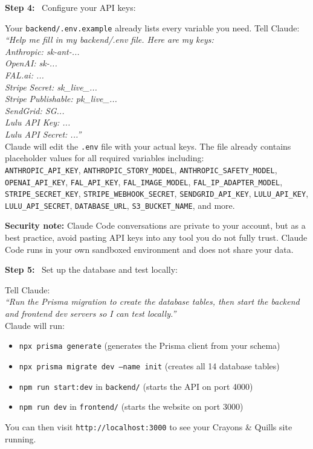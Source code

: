 \documentclass[12pt, letterpaper, oneside]{book}
\newcommand{\step}[1]{\noindent\textbf{\textcolor{primary}{Step #1:}}~}
\begin{document}
\step{4} Configure your API keys:
\begin{actionbox}
Your \texttt{backend/.env.example} already lists every variable you need. Tell Claude:\\[4pt]
\textit{``Help me fill in my backend/.env file. Here are my keys:}\\
\textit{Anthropic: sk-ant-...}\\
\textit{OpenAI: sk-...}\\
\textit{FAL.ai: ...}\\
\textit{Stripe Secret: sk\_live\_...}\\
\textit{Stripe Publishable: pk\_live\_...}\\
\textit{SendGrid: SG...}\\
\textit{Lulu API Key: ...}\\
\textit{Lulu API Secret: ...''}\\[4pt]
Claude will edit the \texttt{.env} file with your actual keys. The file already contains placeholder values for all required variables including:\\
\texttt{ANTHROPIC\_API\_KEY}, \texttt{ANTHROPIC\_STORY\_MODEL}, \texttt{ANTHROPIC\_SAFETY\_MODEL}, \texttt{OPENAI\_API\_KEY}, \texttt{FAL\_API\_KEY}, \texttt{FAL\_IMAGE\_MODEL}, \texttt{FAL\_IP\_ADAPTER\_MODEL}, \texttt{STRIPE\_SECRET\_KEY}, \texttt{STRIPE\_WEBHOOK\_SECRET}, \texttt{SENDGRID\_API\_KEY}, \texttt{LULU\_API\_KEY}, \texttt{LULU\_API\_SECRET}, \texttt{DATABASE\_URL}, \texttt{S3\_BUCKET\_NAME}, and more.
\end{actionbox}

\begin{warningbox}
\textbf{Security note:} Claude Code conversations are private to your account, but as a best practice, avoid pasting API keys into any tool you do not fully trust. Claude Code runs in your own sandboxed environment and does not share your data.
\end{warningbox}

\step{5} Set up the database and test locally:
\begin{actionbox}
Tell Claude:\\[4pt]
\textit{``Run the Prisma migration to create the database tables, then start the backend and frontend dev servers so I can test locally.''}\\[4pt]
Claude will run:
\begin{itemize}[leftmargin=1.5em, itemsep=2pt]
  \item \texttt{npx prisma generate} (generates the Prisma client from your schema)
  \item \texttt{npx prisma migrate dev --name init} (creates all 14 database tables)
  \item \texttt{npm run start:dev} in \texttt{backend/} (starts the API on port 4000)
  \item \texttt{npm run dev} in \texttt{frontend/} (starts the website on port 3000)
\end{itemize}
You can then visit \texttt{http://localhost:3000} to see your Crayons \& Quills site running.
\end{actionbox}
\end{document}
